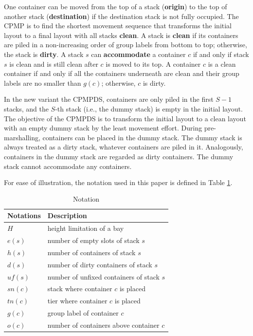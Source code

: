 \documentclass[review,3p,times,authoryear,12pt]{elsarticle}
\begin{document}
One container can be moved from the top of a stack (\textbf{origin}) to the top of another stack (\textbf{destination}) if the destination stack is not fully occupied.
The CPMP is to find the shortest movement sequence that transforms the initial layout to a final layout with all stacks \textbf{clean}.
A stack is \textbf{clean} if its containers are piled in a non-increasing order of group labels from bottom to top; otherwise, the stack is \textbf{dirty}.
A stack $s$ can \textbf{accommodate} a container $c$ if and only if stack $s$ is clean and is still clean after $c$ is moved to its top.
A container $c$ is a clean container if and only if all the containers underneath are clean and their group labels are no smaller than $g(c)$; otherwise, $c$ is dirty.


In the new variant the CPMPDS, containers are only piled in the first $S-1$ stacks, and the $S$-th stack (i.e., the dummy stack) is empty in the initial layout.
The objective of the CPMPDS is to transform the initial layout to a clean layout with an empty dummy stack by the least movement effort.
During pre-marshalling, containers can be placed in the dummy stack.
The dummy stack is always treated as a dirty stack, whatever containers are piled in it.
Analogously, containers in the dummy stack are regarded as dirty containers.
The dummy stack cannot accommodate any containers.

For ease of illustration, the notation used in this paper is defined in Table \ref{tab:1}.

\begin{table}[!htb]
  \centering
  \caption{Notation}
  \label{tab:1}
    \begin{tabular}{l|l}
    \hline
    Notations         & Description \\
    \hline
    $H$               &  height limitation of a bay\\
    $e(s)$            &  number of empty slots of stack $s$\\
    $h(s)$            &  number of containers of stack $s$\\
    $d(s)$            &  number of dirty containers of stack $s$\\
    $\mathit{uf}(s)$      &  number of unfixed containers of stack $s$\\
    $\mathit{sn}(c)$      &  stack where container $c$ is placed\\
    $\mathit{tn}(c)$      &  tier where container $c$ is placed\\
    $g(c)$            &  group label of container $c$\\
    $o(c)$          &  number of containers above container $c$\\
    \hline
    \end{tabular}
\end{table}
\end{document}

